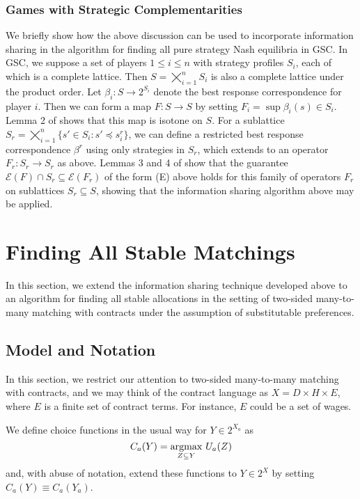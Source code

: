 \documentclass[11pt,reqno]{amsart}
\theoremstyle{definition}
\numberwithin{equation}{section}
\newcommand{\argmax}{\operatornamewithlimits{argmax}}
\newcommand{\sub}{\subseteq}
\newcommand{\fix}{\mathcal{E}}
\newcommand{\peq}{\preceq}
\newcommand{\oper}{F}
\begin{document}
\subsubsection{Games with Strategic Complementarities}
We briefly show how the above discussion can be used to incorporate information sharing in the \cite{Echenique2007Equilibria} algorithm for finding all pure strategy Nash equilibria in GSC. 
In GSC, we suppose a set of players $1 \leq i \leq n$ with strategy profiles $S_i$, each of which is a complete lattice.
Then $S = \bigtimes_{i = 1}^n S_i$ is also a complete lattice under the product order.
Let $\beta_i: S \to 2^{S_i}$ denote the best response correspondence for player $i$.
Then we can form a map $\oper: S \to S$ by setting $\oper_i = \sup \beta_i(s) \in S_i$.
Lemma 2 of \cite{Echenique2007Equilibria} shows that this map is isotone on $S$.
For a sublattice $S_r = \bigtimes_{i = 1}^n \{s' \in S_i: s' \peq s^r_i\}$, we can define a restricted best response correspondence $\beta^r$ using only strategies in $S_r$, which extends to an operator $\oper_r: S_r \to S_r$ as above.
Lemmas 3 and 4 of \cite{Echenique2007Equilibria} show that the guarantee $\fix(\oper) \cap S_r \sub \fix (F_r)$ of the form (E) above holds for this family of operators $\oper_r$ on sublattices $S_r \sub S$, showing that the information sharing algorithm above may be applied.

\section{Finding All Stable Matchings} 
In this section, we extend the information sharing technique developed above to an algorithm for finding all stable allocations in the setting of two-sided many-to-many matching with contracts under the assumption of substitutable preferences.

\subsection{Model and Notation} 
In this section, we restrict our attention to two-sided many-to-many matching with contracts, and we may think of the contract language as $X = D\times H \times E$, where $E$ is a finite set of contract terms. For instance, $E$ could be a set of wages.

We define choice functions in the usual way for $Y\in 2^{X_a}$ as 
\[
C_a(Y) = \argmax_{Z\subseteq Y} \, U_a(Z)
\]
and, with abuse of notation, extend these functions to $Y\in 2^X$ by setting $C_a(Y) \equiv C_a(Y_a)$.
\end{document}
